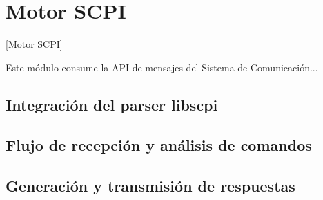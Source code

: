 \chapter{Motor SCPI}[Motor SCPI]
\label{cp:motor-scpi}

Este módulo consume la API de mensajes del Sistema de Comunicación...

\section{Integración del parser libscpi}

\section{Flujo de recepción y análisis de comandos}

\section{Generación y transmisión de respuestas}